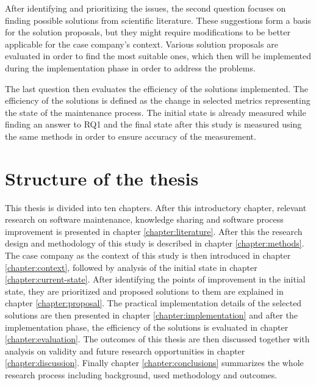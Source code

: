 After identifying and prioritizing the issues, the second question focuses on finding possible solutions from scientific literature. These suggestions form a basis for the solution proposals, but they might require
modifications to be better applicable for the case company's context. Various solution proposals are evaluated in order to find the most suitable ones, which then will be implemented during the
implementation phase in order to address the problems.

The last question then evaluates the efficiency of the solutions implemented. The efficiency of the solutions is defined as the change in selected metrics representing the state of the maintenance process.
The initial state is already measured while finding an answer to RQ1 and the final state after this study is measured using the same methods in order to ensure accuracy of the measurement.

\section{Structure of the thesis}

This thesis is divided into ten chapters. After this introductory chapter, relevant research on software maintenance, knowledge sharing and software process improvement is presented in chapter \ref{chapter:literature}. After this the research design and methodology of this study is described in chapter \ref{chapter:methods}.
The case company as the context of this study is then introduced in chapter \ref{chapter:context}, followed by analysis of the initial state in chapter \ref{chapter:current-state}.
After identifying the points of improvement in the initial state, they are prioritized and proposed solutions to them are explained in chapter \ref{chapter:proposal}. The practical implementation details
of the selected solutions are then presented in chapter \ref{chapter:implementation} and after the implementation phase, the efficiency of
the solutions is evaluated in chapter \ref{chapter:evaluation}.
The outcomes of this thesis are then discussed together with analysis on validity and future research opportunities in chapter \ref{chapter:discussion}. Finally chapter \ref{chapter:conclusions}
summarizes the whole research process including background, used methodology and outcomes.